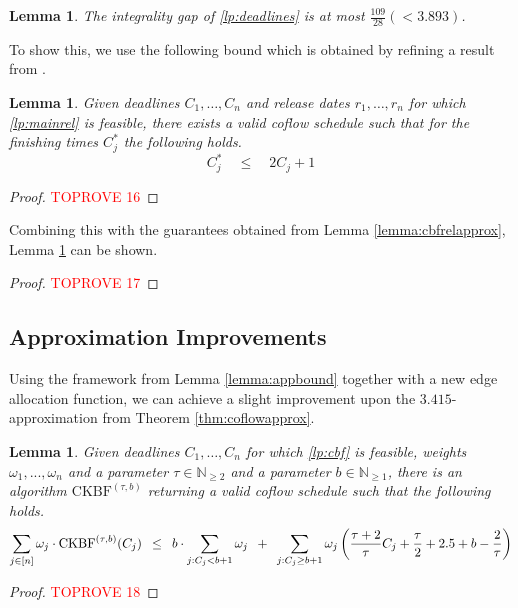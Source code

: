 \documentclass[11pt]{article}
\newcommand{\Hquad}{\hspace{0.5em}}
\newtheorem{lemma}[theorem]{Lemma}
\begin{document}
\begin{lemma}\label{lemma:lpintgap}
The integrality gap of \ref{lp:deadlines} is at most $\frac{109}{28}(<3.893)$.
\end{lemma}

\noindent To show this, we use the following bound which is obtained by refining a result from \cite{fukunaga22}.

\begin{lemma}\label{lemma:hypergraphexist}
Given deadlines $C_1,\dotsc,C_n$ and release dates $r_1,\dotsc,r_n$ for which \ref{lp:mainrel} is feasible, there exists a valid coflow schedule such that for the finishing times $C^*_j$ the following holds.
\begin{equation*}
    C^*_j \quad \le \quad 2C_j + 1
\end{equation*}
\end{lemma}
\begin{proof}\textcolor{red}{TOPROVE 16}\end{proof}

\noindent Combining this with the guarantees obtained from Lemma \ref{lemma:cbfrelapprox}, Lemma \ref{lemma:lpintgap} can be shown.
\begin{proof}\textcolor{red}{TOPROVE 17}\end{proof}

\subsection{Approximation Improvements}\label{sec:app:approximprov}

Using the framework from Lemma \ref{lemma:appbound} together with a new edge allocation function, we can achieve a slight improvement upon the $3.415$-approximation from Theorem \ref{thm:coflowapprox}.\\

\begin{lemma}\label{label:app:koenigcbf}
Given deadlines $C_1,\dotsc,C_n$ for which \ref{lp:cbf} is feasible, weights $\omega_1,...,\omega_n$ and a parameter $\tau \in \mathbb{N}_{\ge 2}$ and a parameter $b \in \mathbb{N}_{\ge 1}$, there is an algorithm $\mathrm{CKBF}^{(\tau,b)}$ returning a valid coflow schedule such that the following holds.
\begin{equation*}
    \sum_{j \in [n]}\omega_j \cdot\mathrm{CKBF}^{(\tau,b)}(C_j) \Hquad\le\Hquad b \cdot \sum_{j: C_j < b+1} \omega_j \Hquad + \Hquad \sum_{j: C_j \ge b+1}\omega_j\left(\frac{\tau+2}{\tau}C_j + \frac{\tau}{2} + 2.5 + b - \frac{2}{\tau}\right)
\end{equation*}
\end{lemma}
\begin{proof}\textcolor{red}{TOPROVE 18}\end{proof}
\end{document}
